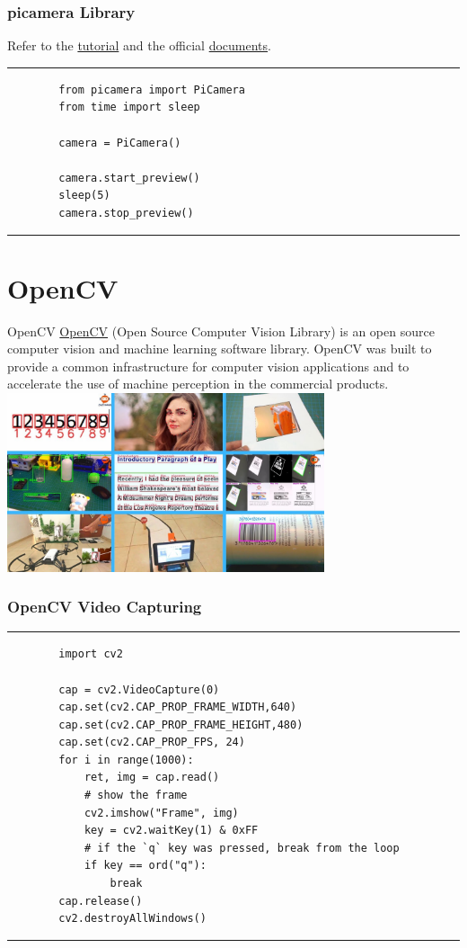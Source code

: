 \documentclass[12pt,letterpaper]{beamer}
\begin{document}
\begin{frame}[fragile]
    \frametitle{picamera Library}
    Refer to the \href{https://projects.raspberrypi.org/en/projects/getting-started-with-picamera}{tutorial} and the official \href{https://picamera.readthedocs.io/en/release-1.13/}{documents}.
    \rule{\textwidth}{1pt}   
    \scriptsize
    \begin{verbatim}
        from picamera import PiCamera
        from time import sleep

        camera = PiCamera()

        camera.start_preview()
        sleep(5)
        camera.stop_preview()
    \end{verbatim}
    \rule{\textwidth}{1pt}   
\end{frame}

\section{OpenCV}

\begin{frame}{OpenCV}
    \href{https://opencv.org/}{OpenCV} (Open Source Computer Vision Library) is an open source computer vision and machine learning software library. 
    OpenCV was built to provide a common infrastructure for computer vision applications and to accelerate the use of machine perception in the commercial products.
    \centering
    \includegraphics[width=0.7\textwidth]{opencv_projects}
\end{frame}

\begin{frame}[fragile]
    \frametitle{OpenCV Video Capturing}
    \rule{\textwidth}{1pt}   
    {\scriptsize
    \begin{verbatim} 
        import cv2

        cap = cv2.VideoCapture(0)
        cap.set(cv2.CAP_PROP_FRAME_WIDTH,640)
        cap.set(cv2.CAP_PROP_FRAME_HEIGHT,480)
        cap.set(cv2.CAP_PROP_FPS, 24)
        for i in range(1000):
            ret, img = cap.read()
            # show the frame
            cv2.imshow("Frame", img)
            key = cv2.waitKey(1) & 0xFF
            # if the `q` key was pressed, break from the loop
            if key == ord("q"):
                break
        cap.release()
        cv2.destroyAllWindows()
    \end{verbatim} 
}
    \rule{\textwidth}{1pt}   
\end{frame}
\end{document}
